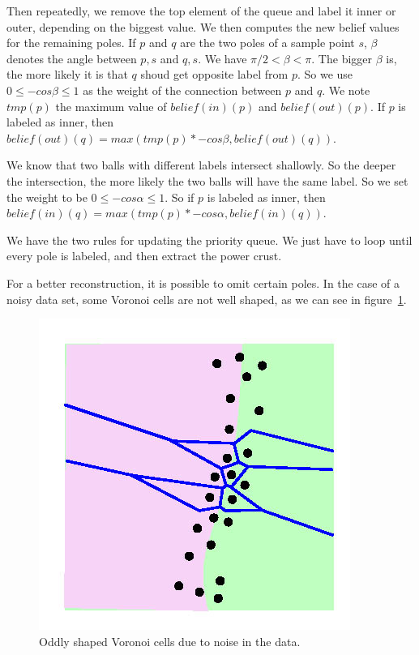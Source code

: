 \documentclass[12pt]{article}
\begin{document}
Then repeatedly, we remove the top element of the queue and label it inner or outer, depending on the biggest value. We then computes the new belief values for the remaining poles. If $p$ and $q$ are the two poles of a sample point $s$, $\beta$ denotes the angle between $p,s$ and $q,s$. We have $\pi/2 < \beta < \pi$. The bigger $\beta$ is, the more likely it is that $q$ shoud get opposite label from $p$. So we use $0 \le -cos\beta \le 1$ as the weight of the connection between $p$ and $q$. We note $tmp(p)$ the maximum value of $belief(in)(p)$ and $belief(out)(p)$. If $p$ is labeled as inner, then $belief(out)(q) = max(tmp(p)*-cos\beta, belief(out)(q))$.

We know that two balls with different labels intersect shallowly. So the deeper the intersection, the more likely the two balls will have the same label. So we set the weight to be $0 \le -cos\alpha \le 1$. So if $p$ is labeled as inner, then $belief(in)(q) = max(tmp(p)*-cos\alpha, belief(in)(q))$.

We have the two rules for updating the priority queue. We just have to loop until every pole is labeled, and then extract the power crust.

For a better reconstruction, it is possible to omit certain poles. In the case of a noisy data set, some Voronoi cells are not well shaped, as we can see in figure~\ref{noisePC}.
\begin{figure}[h]
  \centering
  \includegraphics[scale=0.3]{noise.jpg}
  \caption{\label{noisePC} Oddly shaped Voronoi cells due to noise in the data.}
\end{figure}
\end{document}
